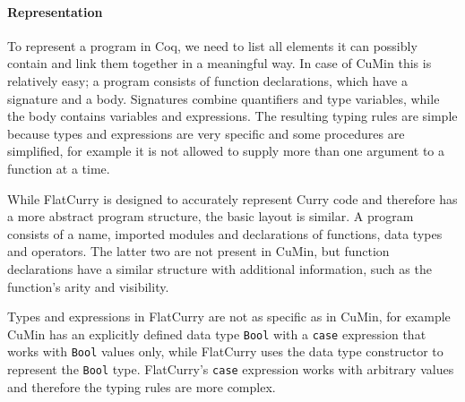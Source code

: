 \documentclass[paper = a4, fleqn, abstract=on, twoside]{scrreprt}
\begin{document}
\paragraph{Representation}
To represent a program in Coq, we need to list all elements it can possibly contain and link them together in a meaningful way. In case of CuMin this is relatively easy; a program consists of function declarations, which have a signature and a body. Signatures combine quantifiers and type variables, while the body contains variables and expressions. The resulting typing rules are simple because types and expressions are very specific and some procedures are simplified, for example it is not allowed to supply more than one argument to a function at a time. 
\par
While FlatCurry is designed to accurately represent Curry code and therefore has a more abstract program structure, the basic layout is similar. A program consists of a name, imported modules and declarations of functions, data types and operators. The latter two are not present in CuMin, but function declarations have a similar structure with additional information, such as the function's arity and visibility.
\par
Types and expressions in FlatCurry are not as specific as in CuMin, for example CuMin has an explicitly defined data type \texttt{Bool} with a \texttt{case} expression that works with \texttt{Bool} values only, while FlatCurry uses the data type constructor to represent the \texttt{Bool} type. FlatCurry's \texttt{case} expression works with arbitrary values and therefore the typing rules are more complex.\\
\end{document}

